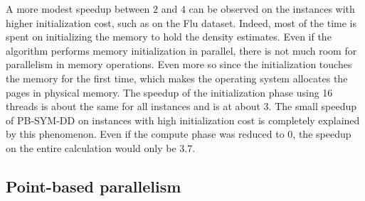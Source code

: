 \documentclass[10pt, conference, compsocconf]{IEEEtran}
\begin{document}
A more modest speedup between $2$ and $4$ can be observed on the
instances with higher initialization cost, such as on the Flu
dataset. Indeed, most of the time is spent on initializing the memory
to hold the density estimates. Even if the algorithm performs memory
initialization in parallel, there is not much room for parallelism in
memory operations. Even more so since the initialization touches the memory
for the first time, which makes the operating system
allocates the pages in physical memory. The speedup of the
initialization phase using 16 threads is about the same for all
instances and is at about $3$. The small speedup of PB-SYM-DD on
instances with high initialization cost is completely explained by
this phenomenon. Even if the compute phase was reduced to $0$, the
speedup on the entire calculation would only be $3.7$. 



\subsection{Point-based parallelism}




\end{document}
